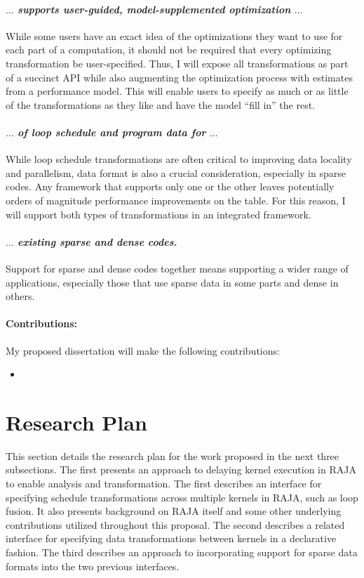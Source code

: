 \documentclass{article}
\begin{document}
\paragraph{$\dots$ \textit{supports user-guided, model-supplemented optimization} $\dots$}
While some users have an exact idea of the optimizations they want to use for each part of a computation, it should not be required that every optimizing transformation be user-specified. 
Thus, I will expose all transformations as part of a succinct API while also augmenting the optimization process with estimates from a performance model. 
This will enable users to specify as much or as little of the transformations as they like and have the model \enquote{fill in} the rest.

\paragraph{$\dots$ \textit{of loop schedule and program data for} $\dots$}
While loop schedule transformations are often critical to improving data locality and parallelism, data format is also a crucial consideration, especially in sparse codes. 
Any framework that supports only one or the other leaves potentially orders of magnitude performance improvements on the table.
For this reason, I will support both types of transformations in an integrated framework.
\paragraph{$\dots$ \textit{existing sparse and dense codes.}}
Support for sparse and dense codes together means supporting a wider range of applications, especially those that use sparse data in some parts and dense in others.




\paragraph{Contributions:}
My proposed dissertation will make the following contributions:
\begin{itemize}
\item 
\end{itemize}
\section{Research Plan}
This section details the research plan for the work proposed in the next three subsections. 
The first presents an approach to delaying kernel execution in RAJA to enable analysis and transformation.
The first describes an interface for specifying schedule transformations across multiple kernels in RAJA, such as loop fusion. 
It also presents background on RAJA itself and some other underlying contributions utilized throughout this proposal.
The second describes a related interface for specifying data transformations between kernels in a declarative fashion. 
The third describes an approach to incorporating support for sparse data formats into the two previous interfaces. 
\end{document}
